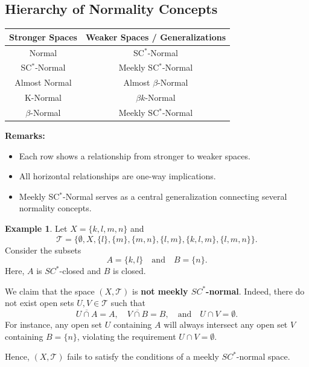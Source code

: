 \documentclass[12pt,a4paper,twoside]{report}  %
\theoremstyle{plain}
\theoremstyle{definition}
\newtheorem{example}[theorem]{Example}
\begin{document}
\subsection{Hierarchy of Normality Concepts}

\begin{center}
\begin{tabular}{|c|c|}
\hline
\textbf{Stronger Spaces} & \textbf{Weaker Spaces / Generalizations} \\ \hline
Normal & SC$^*$-Normal \\ \hline
SC$^*$-Normal & Meekly SC$^*$-Normal \\ \hline
Almost Normal & Almost $\beta$-Normal \\ \hline
K-Normal & $\beta k$-Normal \\ \hline
$\beta$-Normal & Meekly SC$^*$-Normal \\ \hline
\end{tabular}
\end{center}

\vspace{1mm}
\noindent \textbf{Remarks:}
\begin{itemize}
    \item Each row shows a relationship from stronger to weaker spaces. 
    \item All horizontal relationships are one-way implications.
    \item Meekly SC$^*$-Normal serves as a central generalization connecting several normality concepts.
\end{itemize}

\begin{example}
Let $X = \{k, l, m, n\}$ and 
\[
\mathcal{T} = \{\emptyset, X, \{l\}, \{m\}, \{m, n\}, \{l, m\}, \{k, l, m\}, \{l, m, n\}\}.
\] 
Consider the subsets 
\[
A = \{k, l\} \quad \text{and} \quad B = \{n\}.
\] 
Here, $A$ is $SC^*$-closed and $B$ is closed.  

We claim that the space $(X, \mathcal{T})$ is \textbf{not meekly $SC^*$-normal}. Indeed, there do not exist open sets $U, V \in \mathcal{T}$ such that
\[
\overline{U \cap A} = A, \quad \overline{V \cap B} = B, \quad \text{and} \quad U \cap V = \emptyset.
\] 
For instance, any open set $U$ containing $A$ will always intersect any open set $V$ containing $B = \{n\}$, violating the requirement $U \cap V = \emptyset$.  

Hence, $(X, \mathcal{T})$ fails to satisfy the conditions of a meekly $SC^*$-normal space.
\end{example}
\end{document}
